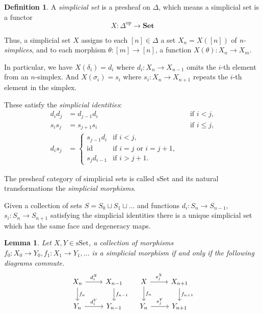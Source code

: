 \documentclass[12pt]{article}
\newtheorem{lemma}[theorem]{Lemma}
\theoremstyle{definition}
\newtheorem{definition}[theorem]{Definition}
\newcommand{\1}{\mathbbm{1}}
\newcommand{\Set}{\mathbf{Set}}
\begin{document}
\begin{definition}
    A \emph{simplicial set} is a presheaf on \( \Delta \), which means a simplicial set is a functor
    \[
    X \colon \Delta^{\mathrm{op}} \to \Set
    \]
    
    Thus, a simplicial set \( X \) assigns to each \( [n] \in \Delta \) a set \( X_n = X([n]) \) of \emph{n-simplices}, and to each morphism \( \theta \colon [m] \to [n] \), a function \( X(\theta) \colon X_n \to X_m \).
    
    In particular, we have $X(\delta_i) = d_i$ where $d_i: X_n\to X_{n-1}$ omits the $i$-th element from an $n$-simplex. And $X(\sigma_i) = s_i$ where $s_i: X_n \to X_{n+1}$ repeats the $i$-th element in the simplex.
    
    These satisfy the \emph{simplicial identities}:
    \[
    \begin{aligned}
    d_i d_j &= d_{j-1} d_i && \text{if } i < j, \\
    s_i s_j &= s_{j+1} s_i && \text{if } i \leq j, \\
    d_i s_j &=
    \begin{cases}
    s_{j-1} d_i & \text{if } i < j, \\
    \mathrm{id} & \text{if } i = j \text{ or } i = j+1, \\
    s_j d_{i-1} & \text{if } i > j+1.
    \end{cases}
    \end{aligned}
    \]

    The presheaf category of simplicial sets is called $\mathrm{sSet}$ and its natural transformations the \emph{simplicial morphisms}.
    
    Given a collection of sets $S = S_0 \sqcup S_1 \sqcup \dots$ and functions $d_i: S_n\to S_{n-1}$, $s_i: S_n \to S_{n+1}$ satisfying the simplicial identities there is a unique simplicial set which has the same face and degeneracy maps.
\end{definition}

\begin{lemma}
    Let $X, Y\in \mathrm{sSet}$, a collection of morphisms $f_0: X_0\to Y_0, f_1: X_1\to Y_1, \dots$ is a simplicial morphism if and only if the following diagrams commute.
    \[
        \begin{tikzcd}
        X_n \arrow{r}{d_i^X} \arrow{d}{f_n} & X_{n-1} \arrow{d}{f_{n-1}} \\
        Y_n \arrow{r}{d_i^Y} & Y_{n-1}
        \end{tikzcd}
        \quad
        \begin{tikzcd}
        X \arrow{r}{s_j^X} \arrow{d}{f_n} & X_{n+1} \arrow{d}{f_{n+1}} \\
        Y_n \arrow{r}{s_j^Y} & Y_{n+1}
        \end{tikzcd}
    \]
\end{lemma}
\end{document}
